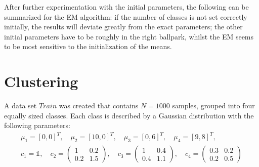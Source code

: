 \documentclass[DIV=12, ngerman, fontsize=12pt, parskip=half]{scrreprt}
\begin{document}
	After further experimentation with the initial parameters, the following can be summarized for the EM algorithm: if the number of classes is not set correctly initially, the results will deviate greatly from the exact parameters; the other initial parameters have to be roughly in the right ballpark, whilst the EM seems to be most sensitive to the initialization of the means. 

	

	{\let\clearpage\relax \chapter{Clustering}}
	
	A data set $Train$ was created that contains $N = 1000$ samples, grouped into four equally sized classes. Each class is described by a Gaussian distribution with the following parameters:
	\begin{align*}
		\mu_1 = [0,0]^T, \quad \mu_2 = [10,0]^T, \quad \mu_3 = [0,6]^T, \quad \mu_4 = [9,8]^T, \\
		c_1 = \mathbb{1}, \quad 
		c_2 = \begin{pmatrix}			
			1 & 0.2\\
			0.2 & 1.5
		\end{pmatrix}, \quad 
		c_3 = \begin{pmatrix}			
			1 & 0.4\\
			0.4 & 1.1
		\end{pmatrix}, \quad 
		c_4 = \begin{pmatrix}			
		0.3 & 0.2\\
		0.2 & 0.5
		\end{pmatrix}
	\end{align*}
\end{document}

